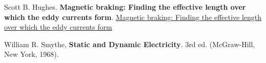 \documentclass[10pt]{amsart}
\begin{document}
\begin{thebibliography}{9}


Scott B. Hughes.  \textbf{Magnetic braking: Finding the effective length over which the eddy currents form}.  
\href{https://drive.google.com/file/d/0Bwo3W0v5P04LX29XT2NFeVY0a1E/view}{Magnetic braking: Finding the effective length over which the eddy currents form}  


William R. Smythe, \textbf{Static and Dynamic Electricity}.  3rd ed. (McGraw-Hill, New York, 1968).  


\end{thebibliography}
\end{document}

